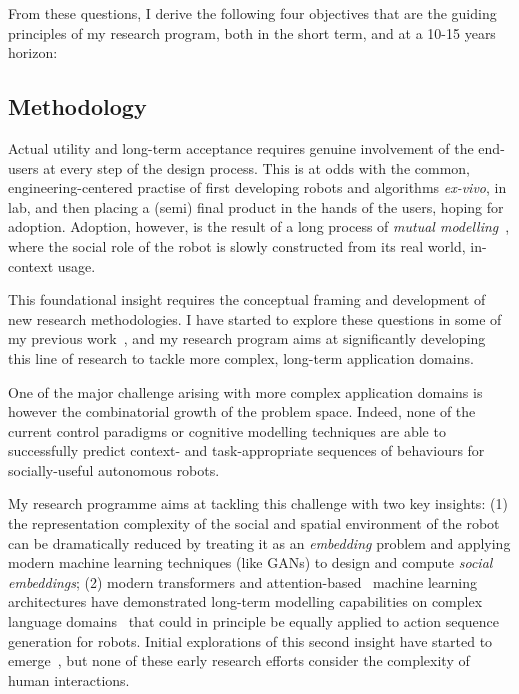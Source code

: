 \vspace{0.5em}
\noindent From these questions, I derive the following four objectives that are
the guiding principles of my research program, both in the short term, and at a
10-15 years horizon:

\subsection{Methodology}

Actual utility and long-term acceptance requires genuine involvement of the
end-users at every step of the design process. This is at odds with the common,
engineering-centered practise of first developing robots and algorithms \emph{ex-vivo}, in
lab, and then placing a (semi) final product in the hands of the users, hoping
for adoption. Adoption, however, is the result of a long process of \emph{mutual
modelling}~\autocite{sabanovicRobotsSocietySociety2010}, where
the social role of the robot is slowly constructed from its real world, in-context
usage.

This foundational insight requires the conceptual framing and development of new
research methodologies.  I have started to explore these questions in some of my
previous work~\autocite{senft2016sparc,winkle2019effective,winkle2021leador},
and my research program aims at significantly developing this line of research
to tackle more complex, long-term application domains.

One of the major challenge arising with more complex application domains is
however the combinatorial growth of the problem space. Indeed, none of the
current control paradigms or cognitive modelling techniques are able to
successfully predict context- and task-appropriate sequences of behaviours
for socially-useful autonomous robots.

\vspace{0.4em}

My research programme aims at tackling this challenge with two key insights: (1) the
representation complexity of the social and spatial environment of the robot 
can be dramatically reduced by treating it as an \emph{embedding} problem and
applying modern machine learning techniques (like GANs) to design and compute
\emph{social embeddings}; (2)
modern transformers and attention-based~\autocite{vaswani2017attention} machine learning
architectures have demonstrated long-term modelling
capabilities on complex language domains~\autocite{instructgpt2022} that could
in principle be equally applied to action sequence generation for
robots. Initial explorations of this second insight have started to
emerge~\autocite{rt12022,vemprala2023chatgpt}, but none of these early research
efforts consider the complexity of human interactions.


